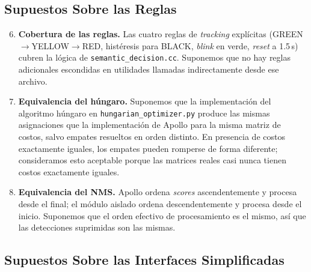 \subsection{Supuestos Sobre las Reglas}

\begin{enumerate}
    \setcounter{enumi}{5}
    \item \textbf{Cobertura de las reglas.} Las cuatro reglas de \textit{tracking} explícitas (GREEN$\to$YELLOW$\to$RED, histéresis para BLACK, \textit{blink} en verde, \textit{reset} a 1.5\,s) cubren la lógica de \texttt{semantic\_decision.cc}. Suponemos que no hay reglas adicionales escondidas en utilidades llamadas indirectamente desde ese archivo.

    \item \textbf{Equivalencia del húngaro.} Suponemos que la implementación del algoritmo húngaro en \texttt{hungarian\_optimizer.py} produce las mismas asignaciones que la implementación de Apollo para la misma matriz de costos, salvo empates resueltos en orden distinto. En presencia de costos exactamente iguales, los empates pueden romperse de forma diferente; consideramos esto aceptable porque las matrices reales casi nunca tienen costos exactamente iguales.

    \item \textbf{Equivalencia del NMS.} Apollo ordena \textit{scores} ascendentemente y procesa desde el final; el módulo aislado ordena descendentemente y procesa desde el inicio. Suponemos que el orden efectivo de procesamiento es el mismo, así que las detecciones suprimidas son las mismas.
\end{enumerate}

\subsection{Supuestos Sobre las Interfaces Simplificadas}

